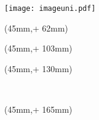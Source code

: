 \titlehead{\hsmatyp\ in\  \hsmastudienganglang}
\subject{}
\title{\hsmatitel}
\author{\hsmaauthor}
\date{\small{\hsmadatum}}


\newlength{\bindekorrektur}
\newlength{\seitenanfang}
\newlength{\seitenbreite}

\setlength{\bindekorrektur}{-46mm}   %
\setlength{\seitenanfang}{0mm}       %
\setlength{\seitenbreite}{297mm}     %

\noindent\texttt{[image: imageuni.pdf]}\\

\begin{textblock*}{128mm}(45mm,\seitenanfang + 62mm) %
  \centering\Large\sffamily
  \vspace{4mm} %
  \textbf{\hsmatitel}
\end{textblock*}%

\begin{textblock*}{128mm}(45mm,\seitenanfang + 103mm)
  \centering\large\sffamily
  \hsmaautor
\end{textblock*}

\begin{textblock*}{128mm}(45mm,\seitenanfang + 130mm)
  \centering\large\sffamily
  \hsmatyp\\
  \begin{small}\hsmathesistype \end{small}\\
  \vspace{2mm}
  \hsmastudiengangname
\end{textblock*}

\begin{textblock*}{128mm}(45mm,\seitenanfang + 165mm)
  \centering\large\sffamily
  \hsmafakultaetlang\\
  \vspace{2mm}
  \hsmakoerperschaft
\end{textblock*}

